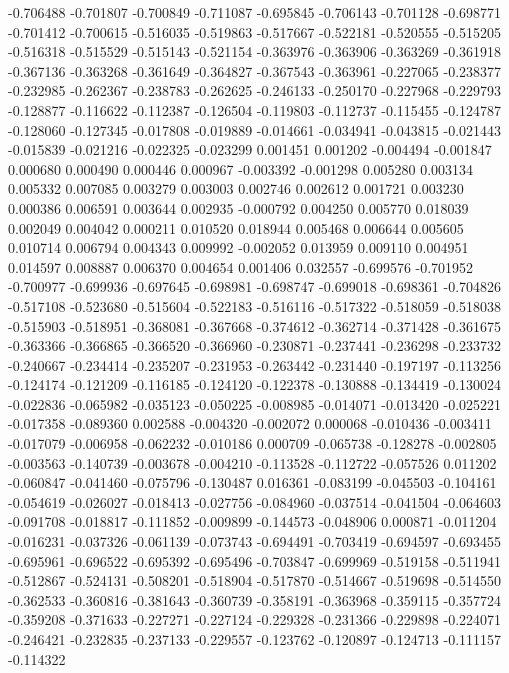 -0.706488
-0.701807
-0.700849
-0.711087
-0.695845
-0.706143
-0.701128
-0.698771
-0.701412
-0.700615
-0.516035
-0.519863
-0.517667
-0.522181
-0.520555
-0.515205
-0.516318
-0.515529
-0.515143
-0.521154
-0.363976
-0.363906
-0.363269
-0.361918
-0.367136
-0.363268
-0.361649
-0.364827
-0.367543
-0.363961
-0.227065
-0.238377
-0.232985
-0.262367
-0.238783
-0.262625
-0.246133
-0.250170
-0.227968
-0.229793
-0.128877
-0.116622
-0.112387
-0.126504
-0.119803
-0.112737
-0.115455
-0.124787
-0.128060
-0.127345
-0.017808
-0.019889
-0.014661
-0.034941
-0.043815
-0.021443
-0.015839
-0.021216
-0.022325
-0.023299
0.001451
0.001202
-0.004494
-0.001847
0.000680
0.000490
0.000446
0.000967
-0.003392
-0.001298
0.005280
0.003134
0.005332
0.007085
0.003279
0.003003
0.002746
0.002612
0.001721
0.003230
0.000386
0.006591
0.003644
0.002935
-0.000792
0.004250
0.005770
0.018039
0.002049
0.004042
0.000211
0.010520
0.018944
0.005468
0.006644
0.005605
0.010714
0.006794
0.004343
0.009992
-0.002052
0.013959
0.009110
0.004951
0.014597
0.008887
0.006370
0.004654
0.001406
0.032557
-0.699576
-0.701952
-0.700977
-0.699936
-0.697645
-0.698981
-0.698747
-0.699018
-0.698361
-0.704826
-0.517108
-0.523680
-0.515604
-0.522183
-0.516116
-0.517322
-0.518059
-0.518038
-0.515903
-0.518951
-0.368081
-0.367668
-0.374612
-0.362714
-0.371428
-0.361675
-0.363366
-0.366865
-0.366520
-0.366960
-0.230871
-0.237441
-0.236298
-0.233732
-0.240667
-0.234414
-0.235207
-0.231953
-0.263442
-0.231440
-0.197197
-0.113256
-0.124174
-0.121209
-0.116185
-0.124120
-0.122378
-0.130888
-0.134419
-0.130024
-0.022836
-0.065982
-0.035123
-0.050225
-0.008985
-0.014071
-0.013420
-0.025221
-0.017358
-0.089360
0.002588
-0.004320
-0.002072
0.000068
-0.010436
-0.003411
-0.017079
-0.006958
-0.062232
-0.010186
0.000709
-0.065738
-0.128278
-0.002805
-0.003563
-0.140739
-0.003678
-0.004210
-0.113528
-0.112722
-0.057526
0.011202
-0.060847
-0.041460
-0.075796
-0.130487
0.016361
-0.083199
-0.045503
-0.104161
-0.054619
-0.026027
-0.018413
-0.027756
-0.084960
-0.037514
-0.041504
-0.064603
-0.091708
-0.018817
-0.111852
-0.009899
-0.144573
-0.048906
0.000871
-0.011204
-0.016231
-0.037326
-0.061139
-0.073743
-0.694491
-0.703419
-0.694597
-0.693455
-0.695961
-0.696522
-0.695392
-0.695496
-0.703847
-0.699969
-0.519158
-0.511941
-0.512867
-0.524131
-0.508201
-0.518904
-0.517870
-0.514667
-0.519698
-0.514550
-0.362533
-0.360816
-0.381643
-0.360739
-0.358191
-0.363968
-0.359115
-0.357724
-0.359208
-0.371633
-0.227271
-0.227124
-0.229328
-0.231366
-0.229898
-0.224071
-0.246421
-0.232835
-0.237133
-0.229557
-0.123762
-0.120897
-0.124713
-0.111157
-0.114322
